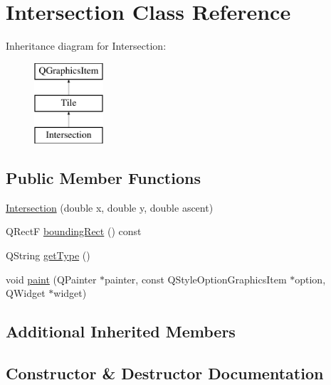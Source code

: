 \hypertarget{class_intersection}{}\section{Intersection Class Reference}
\label{class_intersection}
Inheritance diagram for Intersection\+:\begin{figure}[H]
\begin{center}
\leavevmode
\includegraphics[height=3.000000cm]{class_intersection}
\end{center}
\end{figure}
\subsection*{Public Member Functions}
\begin{DoxyCompactItemize}
\item 
\mbox{\hyperlink{class_intersection_ae877f46e9471e82f16ff180c41e1490a}{Intersection}} (double x, double y, double ascent)
\item 
Q\+RectF \mbox{\hyperlink{class_intersection_a0d96ac4dc6971a4a99ab652b7f15ed41}{bounding\+Rect}} () const
\item 
Q\+String \mbox{\hyperlink{class_intersection_a8bed77f9049accb2dcc50c3e961f5143}{get\+Type}} ()
\item 
void \mbox{\hyperlink{class_intersection_aa9e14b51410964e0ce66b1762bec252a}{paint}} (Q\+Painter $\ast$painter, const Q\+Style\+Option\+Graphics\+Item $\ast$option, Q\+Widget $\ast$widget)
\end{DoxyCompactItemize}
\subsection*{Additional Inherited Members}


\subsection{Constructor \& Destructor Documentation}
\mbox{\label{class_intersection_ae877f46e9471e82f16ff180c41e1490a}} 
